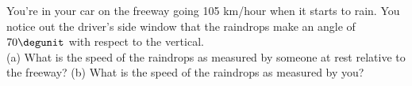 You're in your car on the freeway going 105 km/hour
when it starts to rain. You notice out the driver's side window that
the raindrops make an angle of $70\degunit$ with respect to the
vertical.\\
%
(a) What is the speed of the raindrops as measured by someone 
at rest relative to the freeway?\answercheck\hwendpart
%
(b) What is the speed of the raindrops as measured by you?\answercheck
